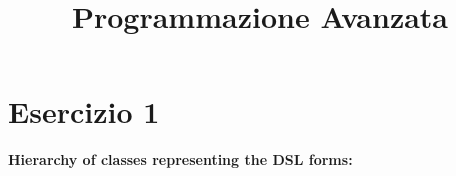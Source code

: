 \documentclass[10pt]{article}
\begin{document}
\title{Programmazione Avanzata}
\section*{Esercizio 1}
\textbf{Hierarchy of classes representing the DSL forms:}
\begin{multicols}{2}
































\end{multicols}
\end{document}
